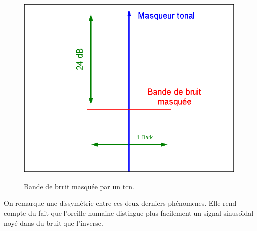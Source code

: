     \begin{figure}[h]
        \centering
        \includegraphics[width=12cm]{figures/masquage_bt.png}\\
        \caption{Bande de bruit masqu{\'e}e par un ton.}
        \label{masquage_bt}
    \end{figure}

    On remarque une dissym{\'e}trie entre ces deux derniers
    ph{\'e}nom{\`e}nes. Elle rend compte du fait que l'oreille humaine
    distingue plus facilement un signal sinuso{\"\i}dal noy{\'e} dans du
    bruit que l'inverse.
